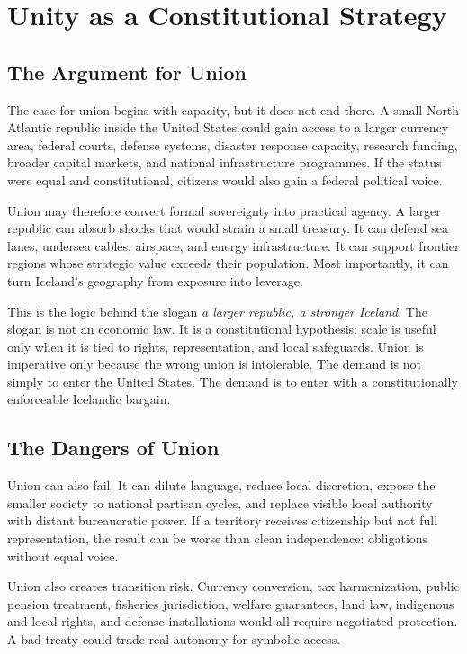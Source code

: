 \documentclass[11pt,a4paper]{article}
\begin{document}
\section{Unity as a Constitutional Strategy}
\subsection{The Argument for Union}
The case for union begins with capacity, but it does not end there. A small North Atlantic republic inside the United States could gain access to a larger currency area, federal courts, defense systems, disaster response capacity, research funding, broader capital markets, and national infrastructure programmes. If the status were equal and constitutional, citizens would also gain a federal political voice.

Union may therefore convert formal sovereignty into practical agency. A larger republic can absorb shocks that would strain a small treasury. It can defend sea lanes, undersea cables, airspace, and energy infrastructure. It can support frontier regions whose strategic value exceeds their population. Most importantly, it can turn Iceland's geography from exposure into leverage.

This is the logic behind the slogan \textit{a larger republic, a stronger Iceland}. The slogan is not an economic law. It is a constitutional hypothesis: scale is useful only when it is tied to rights, representation, and local safeguards. Union is imperative only because the wrong union is intolerable. The demand is not simply to enter the United States. The demand is to enter with a constitutionally enforceable Icelandic bargain.

\subsection{The Dangers of Union}
Union can also fail. It can dilute language, reduce local discretion, expose the smaller society to national partisan cycles, and replace visible local authority with distant bureaucratic power. If a territory receives citizenship but not full representation, the result can be worse than clean independence: obligations without equal voice.

Union also creates transition risk. Currency conversion, tax harmonization, public pension treatment, fisheries jurisdiction, welfare guarantees, land law, indigenous and local rights, and defense installations would all require negotiated protection. A bad treaty could trade real autonomy for symbolic access.
\end{document}
